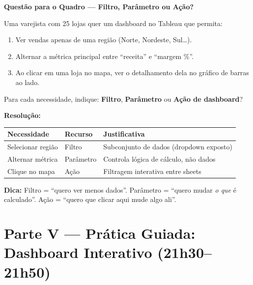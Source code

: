 \begin{SolvedBox}
\textbf{Questão para o Quadro — Filtro, Parâmetro ou Ação?}

Uma varejista com 25 lojas quer um dashboard no Tableau que permita:
\begin{enumerate}
  \item Ver vendas apenas de uma região (Norte, Nordeste, Sul\ldots).
  \item Alternar a métrica principal entre ``receita'' e ``margem \%''.
  \item Ao clicar em uma loja no mapa, ver o detalhamento dela no
  gráfico de barras ao lado.
\end{enumerate}

Para cada necessidade, indique: \textbf{Filtro}, \textbf{Parâmetro}
ou \textbf{Ação de dashboard}?

\textbf{Resolução:}
\begin{center}
\begin{tabular}{|l|l|p{6.5cm}|}
\hline
\textbf{Necessidade} & \textbf{Recurso} & \textbf{Justificativa} \\
\hline
Selecionar região & Filtro & Subconjunto de dados (dropdown exposto) \\
\hline
Alternar métrica & Parâmetro & Controla lógica de cálculo, não dados \\
\hline
Clique no mapa & Ação & Filtragem interativa entre sheets \\
\hline
\end{tabular}
\end{center}

\textbf{Dica:} Filtro = ``quero ver menos dados''. Parâmetro =
``quero mudar \emph{o que} é calculado''. Ação = ``quero que clicar
aqui mude algo ali''.
\end{SolvedBox}

\section{Parte V — Prática Guiada: Dashboard Interativo (21h30–21h50)}


